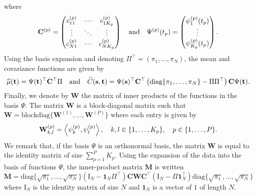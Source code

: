 where
\begin{equation}
\mathbf{C}^{(p)} = \begin{pmatrix}
    c^{(p)}_{11} & \cdots & c^{(p)}_{1K_p} \\
    \vdots & \ddots & \vdots \\
    c^{(p)}_{N1} & \cdots & c^{(p)}_{NK_p}
\end{pmatrix} \\
\quad \text{and}\quad
\Psi^{(p)}(t_p) = \begin{pmatrix}
    \psi_1^{(p)}(t_p) \\
    \vdots \\
    \psi_{K_p}^{(p)}(t_p)
\end{pmatrix}.
\end{equation}
Using the basis expansion and denoting $\Pi^\top = (\pi_1, \dots, \pi_N)$, the mean and covariance functions are given by
\begin{equation}
    \widehat{\mu}(\mathbf{t}) = \Psi(\mathbf{t})^\top \mathbf{C}^\top\Pi \quad\text{and}\quad \widehat{C}(\mathbf{s}, \mathbf{t}) = \Psi(\mathbf{s})^\top \mathbf{C}^\top \left(\text{diag}\{
        \pi_1, \dots, \pi_N\} - \Pi\Pi^\top\right)\mathbf{C} \Psi(\mathbf{t}).
\end{equation}
Finally, we denote by $\mathbf{W}$ the matrix of inner products of the functions in the basis $\Psi$. The matrix $\mathbf{W}$ is a block-diagonal matrix such that $\mathbf{W} = \text{blockdiag}\{\mathbf{W}^{(1)}, \dots, \mathbf{W}^{(P)}\}$ where each entry is given by
\begin{equation}
    \mathbf{W}_{k, l}^{(p)} = \left\langle\psi_k^{(p)}, \psi_l^{(p)}\right\rangle, \quad k, l \in \{1, \dots, K_p\}, \quad p \in \{1, \dots, P\}.
\end{equation}
We remark that, if the basis $\Psi$ is an orthonormal basis, the matrix $\mathbf{W}$ is equal to the identity matrix of size $\sum_{p = 1}^P K_p$.
Using the expansion of the data into the basis of functions $\Psi$, the inner-product matrix $\mathbf{M}$ is written 
\begin{equation}\label{eq:gram_matrix_basis}
    \mathbf{M} = \text{diag}\{
        \sqrt{\pi_1}, \dots, \sqrt{\pi_N}\}\left(\mathrm{I}_{\!N} - \mathbf{1}_{\!N}\Pi^\top\right) \mathbf{C} \mathbf{W} \mathbf{C}^\top \left(\mathrm{I}_{\!N} - \Pi\mathbf{1}_{\!N}^\top\right)\text{diag}\{
        \sqrt{\pi_1}, \dots, \sqrt{\pi_N}\}
\end{equation}
where $\mathrm{I}_{\!N}$ is the identity matrix of size $N$ and $\mathbf{1}_{\!N}$ is a vector of $1$ of length $N$.


